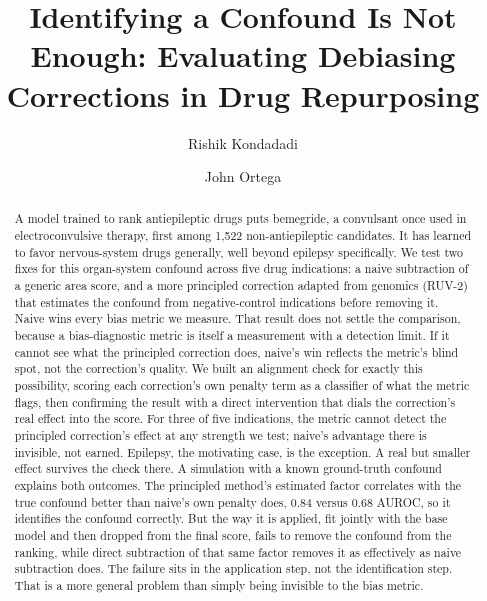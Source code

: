 \documentclass{llncs}
\begin{document}
\title{Identifying a Confound Is Not Enough: Evaluating Debiasing Corrections in Drug Repurposing}

\author{Rishik Kondadadi \and John Ortega}

\maketitle

\begin{abstract}
A model trained to rank antiepileptic drugs puts bemegride, a convulsant once used in electroconvulsive therapy, first among 1{,}522 non-antiepileptic candidates. It has learned to favor nervous-system drugs generally, well beyond epilepsy specifically. We test two fixes for this organ-system confound across five drug indications: a naive subtraction of a generic area score, and a more principled correction adapted from genomics (RUV-2) that estimates the confound from negative-control indications before removing it. Naive wins every bias metric we measure. That result does not settle the comparison, because a bias-diagnostic metric is itself a measurement with a detection limit. If it cannot see what the principled correction does, naive's win reflects the metric's blind spot, not the correction's quality. We built an alignment check for exactly this possibility, scoring each correction's own penalty term as a classifier of what the metric flags, then confirming the result with a direct intervention that dials the correction's real effect into the score. For three of five indications, the metric cannot detect the principled correction's effect at any strength we test; naive's advantage there is invisible, not earned. Epilepsy, the motivating case, is the exception. A real but smaller effect survives the check there. A simulation with a known ground-truth confound explains both outcomes. The principled method's estimated factor correlates with the true confound better than naive's own penalty does, 0.84 versus 0.68 AUROC, so it identifies the confound correctly. But the way it is applied, fit jointly with the base model and then dropped from the final score, fails to remove the confound from the ranking, while direct subtraction of that same factor removes it as effectively as naive subtraction does. The failure sits in the application step, not the identification step. That is a more general problem than simply being invisible to the bias metric.
\end{abstract}
\end{document}
